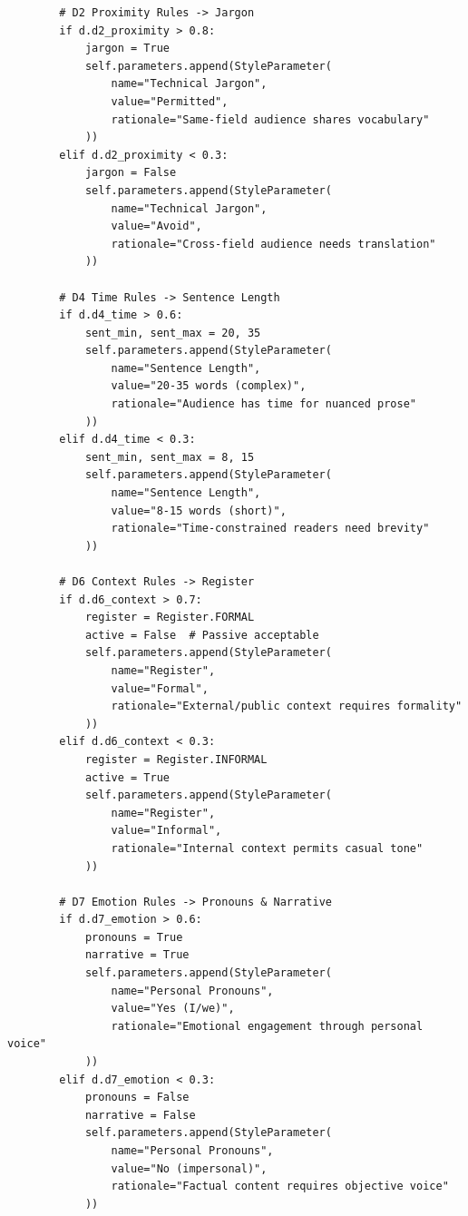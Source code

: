 \begin{verbatim}
        # D2 Proximity Rules -> Jargon
        if d.d2_proximity > 0.8:
            jargon = True
            self.parameters.append(StyleParameter(
                name="Technical Jargon",
                value="Permitted",
                rationale="Same-field audience shares vocabulary"
            ))
        elif d.d2_proximity < 0.3:
            jargon = False
            self.parameters.append(StyleParameter(
                name="Technical Jargon",
                value="Avoid",
                rationale="Cross-field audience needs translation"
            ))

        # D4 Time Rules -> Sentence Length
        if d.d4_time > 0.6:
            sent_min, sent_max = 20, 35
            self.parameters.append(StyleParameter(
                name="Sentence Length",
                value="20-35 words (complex)",
                rationale="Audience has time for nuanced prose"
            ))
        elif d.d4_time < 0.3:
            sent_min, sent_max = 8, 15
            self.parameters.append(StyleParameter(
                name="Sentence Length",
                value="8-15 words (short)",
                rationale="Time-constrained readers need brevity"
            ))

        # D6 Context Rules -> Register
        if d.d6_context > 0.7:
            register = Register.FORMAL
            active = False  # Passive acceptable
            self.parameters.append(StyleParameter(
                name="Register",
                value="Formal",
                rationale="External/public context requires formality"
            ))
        elif d.d6_context < 0.3:
            register = Register.INFORMAL
            active = True
            self.parameters.append(StyleParameter(
                name="Register",
                value="Informal",
                rationale="Internal context permits casual tone"
            ))

        # D7 Emotion Rules -> Pronouns & Narrative
        if d.d7_emotion > 0.6:
            pronouns = True
            narrative = True
            self.parameters.append(StyleParameter(
                name="Personal Pronouns",
                value="Yes (I/we)",
                rationale="Emotional engagement through personal voice"
            ))
        elif d.d7_emotion < 0.3:
            pronouns = False
            narrative = False
            self.parameters.append(StyleParameter(
                name="Personal Pronouns",
                value="No (impersonal)",
                rationale="Factual content requires objective voice"
            ))


\end{verbatim}
